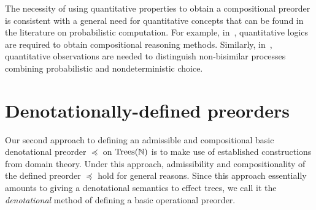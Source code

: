 \documentclass[a4paper,UKenglish]{lipics-v2018}
\newcommand{\Trees}{\textnormal{Trees}}
\newcommand{\Basicleq}{\preccurlyeq}
\theoremstyle{plain}
\begin{document}
The necessity of using quantitative properties to obtain a compositional preorder is consistent with a general need for quantitative concepts that can be found
in the literature on
probabilistic computation. For example, in~\cite{KozenPDL,MciverMorgan}, quantitative logics  are required to obtain compositional reasoning methods.
Similarly, in~\cite{MioUpper}, quantitative observations are needed to distinguish non-bisimilar processes combining probabilistic and nondeterministic choice. 



\section{Denotationally-defined preorders}
\label{section:denotational}

Our second approach to defining an admissible and compositional basic
denotational 
preorder $\Basicleq$ on $\Trees(\mathbb{N})$ is to make use of established constructions from domain theory.
Under this approach, admissibility and compositionality of the defined preorder $\Basicleq$ hold
for general reasons. Since this approach essentially amounts to giving a denotational semantics to effect trees, we call it the \emph{denotational} method of defining a basic operational preorder.
\end{document}
